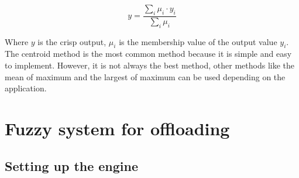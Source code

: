 \begin{equation}
  y = \frac{\sum_{i} \mu_i \cdot y_i}{\sum_{i} \mu_i}
\end{equation}

Where $y$ is the crisp output, $\mu_i$ is the membership value of the output value $y_i$. The centroid method is the
most common method because it is simple and easy to implement. However, it is not always the best method, other methods
like the mean of maximum and the largest of maximum can be used depending on the application.

\section{Fuzzy system for offloading}
\label{sec:fuzzy-offloading}

\subsection{Setting up the engine}
\label{subsec:fuzzy-setup}


